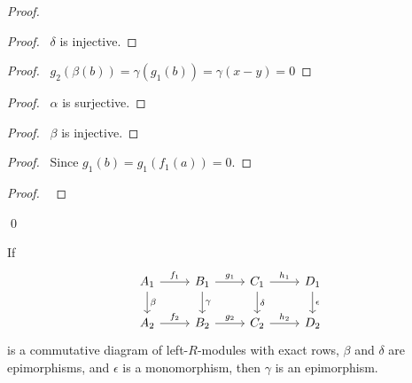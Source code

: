 \begin{proof}
\pf
	\begin{proof}
		\pf\ $\delta$ is injective.
	\end{proof}
	\begin{proof}
		\pf\ $g_2(\beta(b)) = \gamma(g_1(b)) = \gamma(x-y) = 0$
	\end{proof}
	\begin{proof}
		\pf\ $\alpha$ is surjective.
	\end{proof}
	\begin{proof}
		\pf\ $\beta$ is injective.
	\end{proof}
	\begin{proof}
		\pf\ Since $g_1(b) = g_1(f_1(a)) = 0$.
	\end{proof}
	\begin{proof}
		\pf\ 
	\end{proof}
\qed
\end{proof}

\begin{prop}
If
\[ \begin{tikzcd}
A_1 \arrow[r,"f_1"] \arrow[d,"\beta"] & B_1 \arrow[r,"g_1"] \arrow[d,"\gamma"] & C_1 \arrow[r,"h_1"] \arrow[d,"\delta"] & D_1 \arrow[d,"\epsilon"] \\
A_2 \arrow[r,"f_2"] & B_2 \arrow[r,"g_2"] & C_2 \arrow[r,"h_2"] & D_2
\end{tikzcd} \]
is a commutative diagram of left-$R$-modules with exact rows, $\beta$ and $\delta$ are epimorphisms, and $\epsilon$ is a monomorphism, then $\gamma$ is an epimorphism.
\end{prop}

